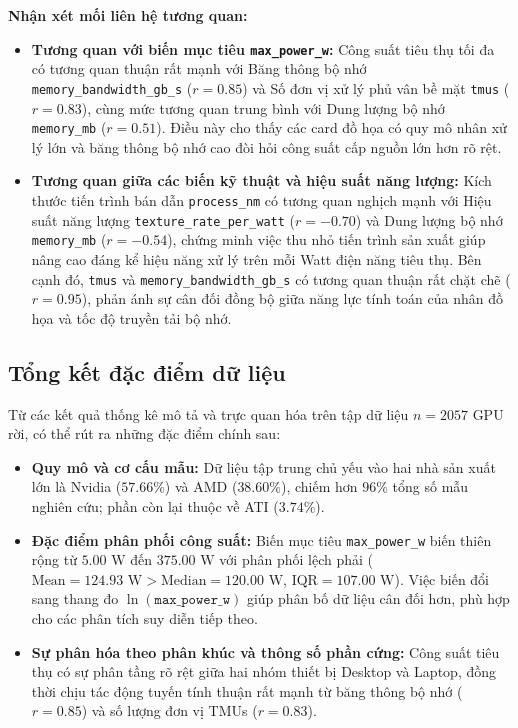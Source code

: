 \documentclass[12pt,a4paper]{article}
\providecommand{\tightlist}{\setlength{\itemsep}{0pt}\setlength{\parskip}{0pt}}
\begin{document}
\textbf{Nhận xét mối liên hệ tương quan:}
\begin{itemize}\tightlist
    \item \textbf{Tương quan với biến mục tiêu \texttt{max\_power\_w}:} Công suất tiêu thụ tối đa có tương quan thuận rất mạnh với Băng thông bộ nhớ \texttt{memory\_bandwidth\_gb\_s} ($r = 0.85$) và Số đơn vị xử lý phủ vân bề mặt \texttt{tmus} ($r = 0.83$), cùng mức tương quan trung bình với Dung lượng bộ nhớ \texttt{memory\_mb} ($r = 0.51$). Điều này cho thấy các card đồ họa có quy mô nhân xử lý lớn và băng thông bộ nhớ cao đòi hỏi công suất cấp nguồn lớn hơn rõ rệt.
    \item \textbf{Tương quan giữa các biến kỹ thuật và hiệu suất năng lượng:} Kích thước tiến trình bán dẫn \texttt{process\_nm} có tương quan nghịch mạnh với Hiệu suất năng lượng \texttt{texture\_rate\_per\_watt} ($r = -0.70$) và Dung lượng bộ nhớ \texttt{memory\_mb} ($r = -0.54$), chứng minh việc thu nhỏ tiến trình sản xuất giúp nâng cao đáng kể hiệu năng xử lý trên mỗi Watt điện năng tiêu thụ. Bên cạnh đó, \texttt{tmus} và \texttt{memory\_bandwidth\_gb\_s} có tương quan thuận rất chặt chẽ ($r = 0.95$), phản ánh sự cân đối đồng bộ giữa năng lực tính toán của nhân đồ họa và tốc độ truyền tải bộ nhớ.
\end{itemize}

\subsection{Tổng kết đặc điểm dữ liệu}

Từ các kết quả thống kê mô tả và trực quan hóa trên tập dữ liệu $n = 2057$ GPU rời, có thể rút ra những đặc điểm chính sau:
\begin{itemize}\tightlist
    \item \textbf{Quy mô và cơ cấu mẫu:} Dữ liệu tập trung chủ yếu vào hai nhà sản xuất lớn là Nvidia ($57.66\%$) và AMD ($38.60\%$), chiếm hơn $96\%$ tổng số mẫu nghiên cứu; phần còn lại thuộc về ATI ($3.74\%$).
    \item \textbf{Đặc điểm phân phối công suất:} Biến mục tiêu \texttt{max\_power\_w} biến thiên rộng từ $5.00\text{ W}$ đến $375.00\text{ W}$ với phân phối lệch phải ($\text{Mean} = 124.93\text{ W} > \text{Median} = 120.00\text{ W}$, $\text{IQR} = 107.00\text{ W}$). Việc biến đổi sang thang đo $\ln(\texttt{max\_power\_w})$ giúp phân bố dữ liệu cân đối hơn, phù hợp cho các phân tích suy diễn tiếp theo.
    \item \textbf{Sự phân hóa theo phân khúc và thông số phần cứng:} Công suất tiêu thụ có sự phân tầng rõ rệt giữa hai nhóm thiết bị Desktop và Laptop, đồng thời chịu tác động tuyến tính thuận rất mạnh từ băng thông bộ nhớ ($r = 0.85$) và số lượng đơn vị TMUs ($r = 0.83$).
\end{itemize}
\end{document}
